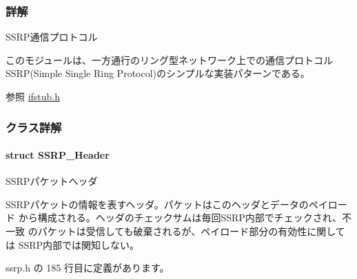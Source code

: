 \subsubsection{詳解}
S\+S\+R\+P通信プロトコル 

このモジュールは、一方通行のリング型ネットワーク上での通信プロトコル S\+S\+R\+P(\+Simple Single Ring Protocol)のシンプルな実装パターンである。

\begin{DoxySeeAlso}{参照}
\hyperlink{ifstub_8h}{ifstub.\+h}
\end{DoxySeeAlso}
 

\subsubsection{クラス詳解}
\label{structSSRP__Header}
\paragraph{struct S\+S\+R\+P\+\_\+\+Header}
S\+S\+R\+Pパケットヘッダ 

S\+S\+R\+Pパケットの情報を表すヘッダ。パケットはこのヘッダとデータのペイロード から構成される。ヘッダのチェックサムは毎回\+S\+S\+R\+P内部でチェックされ、不一致 のパケットは受信しても破棄されるが、ペイロード部分の有効性に関しては S\+S\+R\+P内部では関知しない。 

 ssrp.\+h の 185 行目に定義があります。



